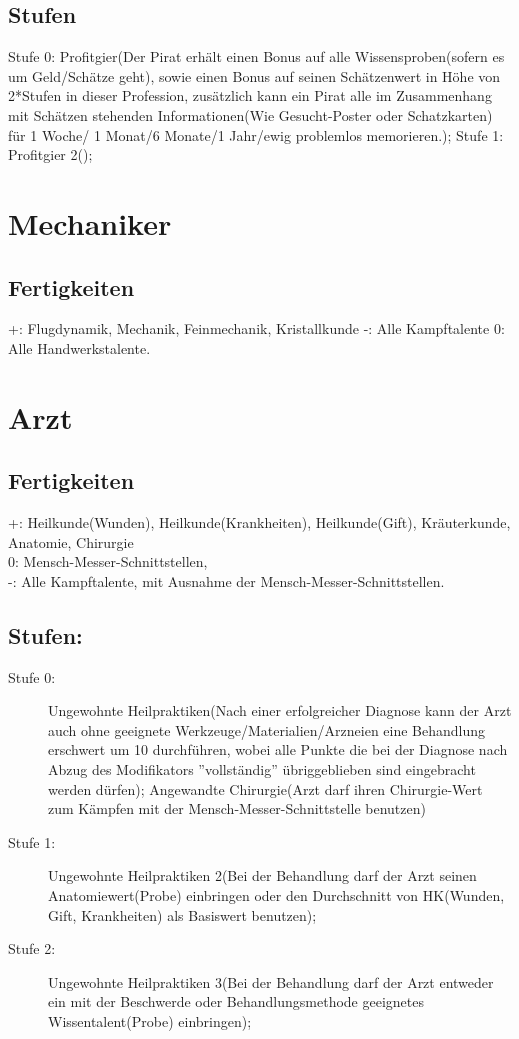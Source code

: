 \documentclass[a4paper,12pt,oneside]{book}
\begin{document}
\subsection{Stufen}
Stufe 0: Profitgier(Der Pirat erhält einen Bonus auf alle Wissensproben(sofern es um Geld/Schätze geht), sowie einen Bonus auf seinen Schätzenwert in Höhe von 2*Stufen in dieser Profession, zusätzlich kann ein Pirat alle im Zusammenhang mit Schätzen stehenden Informationen(Wie Gesucht-Poster oder Schatzkarten) für 1 Woche/ 1 Monat/6 Monate/1 Jahr/ewig problemlos memorieren.);
Stufe 1: Profitgier 2();

\section{Mechaniker}
\subsection{Fertigkeiten}
+: Flugdynamik, Mechanik, Feinmechanik, Kristallkunde
-: Alle Kampftalente
0: Alle Handwerkstalente.

\section{Arzt}
\subsection{Fertigkeiten}
+: Heilkunde(Wunden), Heilkunde(Krankheiten), Heilkunde(Gift), Kräuterkunde, Anatomie, Chirurgie 
\\0: Mensch-Messer-Schnittstellen, 
\\-: Alle Kampftalente, mit Ausnahme der Mensch-Messer-Schnittstellen.
\subsection{Stufen:}
\begin{description}
\item[Stufe 0:]Ungewohnte Heilpraktiken(Nach einer erfolgreicher Diagnose kann der Arzt auch ohne geeignete Werkzeuge/Materialien/Arzneien eine Behandlung erschwert um 10 durchführen, wobei alle Punkte die bei der Diagnose nach Abzug des Modifikators ''vollständig'' übriggeblieben sind eingebracht werden dürfen); Angewandte Chirurgie(Arzt darf ihren Chirurgie-Wert zum Kämpfen mit der Mensch-Messer-Schnittstelle benutzen)
\item[Stufe 1:]Ungewohnte Heilpraktiken 2(Bei der Behandlung darf der Arzt seinen Anatomiewert(Probe) einbringen oder den Durchschnitt von HK(Wunden, Gift, Krankheiten) als Basiswert benutzen);
\item[Stufe 2:]Ungewohnte Heilpraktiken 3(Bei der Behandlung darf der Arzt entweder ein mit der Beschwerde oder Behandlungsmethode geeignetes Wissentalent(Probe) einbringen);
\end{description}
\end{document}
